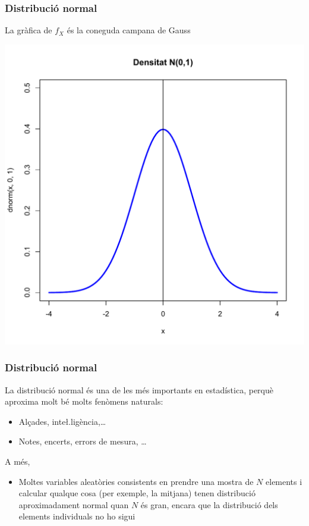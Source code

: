 \documentclass[12pt,t]{beamer}\usepackage[]{graphicx}\usepackage[]{color}
\renewcommand{\emph}[1]{{\color{red}#1}}
\theoremstyle{plain}
\theoremstyle{definition}
\begin{document}
\begin{frame} 
\frametitle{Distribució normal}

La gràfica de $f_X$ és la coneguda \emph{campana de Gauss}
\begin{center}
\includegraphics[width=0.8\linewidth]{dnorm01}
\end{center}

\end{frame}


\begin{frame} 
\frametitle{Distribució normal}



La distribució normal és una de les més importants en estadística, perquè aproxima molt bé molts fenòmens naturals:
\medskip

\begin{itemize}
\item Alçades, inte\l.ligència,\ldots
\item Notes, encerts, errors de mesura, \ldots
\end{itemize}

A més, 
\begin{itemize}
\item Moltes variables aleatòries consistents en prendre una mostra de $N$ elements i calcular qualque cosa (per exemple, la mitjana) tenen distribució aproximadament normal quan $N$ és gran, encara que la distribució dels elements individuals no ho sigui
\end{itemize}


\end{frame}
\end{document}
